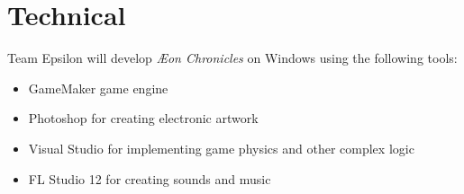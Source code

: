 \documentclass[12pt,titlepage]{article}
\newcommand\gametitle{\textit{\AE on Chronicles}\xspace}
\begin{document}







\newpage
\section{Technical}
%

Team Epsilon will develop \gametitle on Windows using the following tools:

\begin{itemize}
    \item GameMaker game engine
    \item Photoshop for creating electronic artwork
    \item Visual Studio for implementing game physics and other complex logic
    \item FL Studio 12 for creating sounds and music
\end{itemize}
\end{document}

